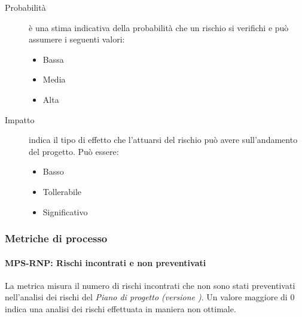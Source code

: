 \documentclass[../../norme-di-progetto.tex]{subfiles}
\begin{document}
\begin{description}
  \item[Probabilità] è una stima indicativa della probabilità che un rischio si verifichi e può assumere i seguenti valori:
        \begin{itemize}
          \item Bassa
          \item Media
          \item Alta
        \end{itemize}
  \item[Impatto] indica il tipo di effetto che l'attuarsi del rischio può avere sull'andamento del progetto. Può essere:
        \begin{itemize}
          \item Basso
          \item Tollerabile
          \item Significativo
        \end{itemize}
\end{description}


\subsubsection{Metriche di processo}%
\label{subs:gestione_dei_rischi/metriche_di_processo}

\paragraph{MPS-RNP: Rischi incontrati e non preventivati}%
\label{par:MPS-RNP_rischi_incontrati_e_non_preventivati}

La metrica misura il numero di rischi incontrati che non sono stati preventivati nell'analisi dei rischi del \textit{Piano di progetto (versione \versione)}. Un valore maggiore di 0 indica una analisi dei rischi effettuata in maniera non ottimale.
\end{document}
